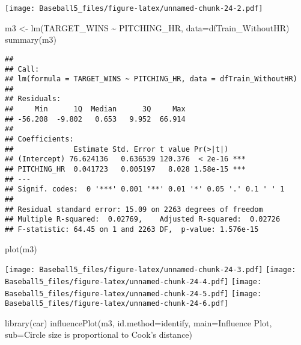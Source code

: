 \documentclass[
]{article}
\newenvironment{Shaded}{\begin{snugshade}}{\end{snugshade}}
\newcommand{\AttributeTok}[1]{\textcolor[rgb]{0.77,0.63,0.00}{#1}}
\newcommand{\FunctionTok}[1]{\textcolor[rgb]{0.00,0.00,0.00}{#1}}
\newcommand{\NormalTok}[1]{#1}
\newcommand{\OtherTok}[1]{\textcolor[rgb]{0.56,0.35,0.01}{#1}}
\newcommand{\SpecialCharTok}[1]{\textcolor[rgb]{0.00,0.00,0.00}{#1}}
\newcommand{\StringTok}[1]{\textcolor[rgb]{0.31,0.60,0.02}{#1}}
\begin{document}
\texttt{[image: Baseball5\_files/figure-latex/unnamed-chunk-24-2.pdf]}

\begin{Shaded}
\begin{Highlighting}[]
\NormalTok{m3 }\OtherTok{\textless{}{-}} \FunctionTok{lm}\NormalTok{(TARGET\_WINS }\SpecialCharTok{\textasciitilde{}}\NormalTok{ PITCHING\_HR, }\AttributeTok{data=}\NormalTok{dfTrain\_WithoutHR)}
\FunctionTok{summary}\NormalTok{(m3)}
\end{Highlighting}
\end{Shaded}

\begin{verbatim}
## 
## Call:
## lm(formula = TARGET_WINS ~ PITCHING_HR, data = dfTrain_WithoutHR)
## 
## Residuals:
##     Min      1Q  Median      3Q     Max 
## -56.208  -9.802   0.653   9.952  66.914 
## 
## Coefficients:
##              Estimate Std. Error t value Pr(>|t|)    
## (Intercept) 76.624136   0.636539 120.376  < 2e-16 ***
## PITCHING_HR  0.041723   0.005197   8.028 1.58e-15 ***
## ---
## Signif. codes:  0 '***' 0.001 '**' 0.01 '*' 0.05 '.' 0.1 ' ' 1
## 
## Residual standard error: 15.09 on 2263 degrees of freedom
## Multiple R-squared:  0.02769,    Adjusted R-squared:  0.02726 
## F-statistic: 64.45 on 1 and 2263 DF,  p-value: 1.576e-15
\end{verbatim}

\begin{Shaded}
\begin{Highlighting}[]
\FunctionTok{plot}\NormalTok{(m3)}
\end{Highlighting}
\end{Shaded}

\texttt{[image: Baseball5\_files/figure-latex/unnamed-chunk-24-3.pdf]}
\texttt{[image: Baseball5\_files/figure-latex/unnamed-chunk-24-4.pdf]}
\texttt{[image: Baseball5\_files/figure-latex/unnamed-chunk-24-5.pdf]}
\texttt{[image: Baseball5\_files/figure-latex/unnamed-chunk-24-6.pdf]}

\begin{Shaded}
\begin{Highlighting}[]
\FunctionTok{library}\NormalTok{(car) }
\FunctionTok{influencePlot}\NormalTok{(m3, }\AttributeTok{id.method=}\StringTok{\textquotesingle{}identify\textquotesingle{}}\NormalTok{, }\AttributeTok{main=}\StringTok{\textquotesingle{}Influence Plot\textquotesingle{}}\NormalTok{, }\AttributeTok{sub=}\StringTok{\textquotesingle{}Circle size is proportional to Cook’s distance\textquotesingle{}}\NormalTok{)}
\end{Highlighting}
\end{Shaded}
\end{document}
